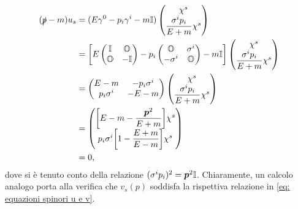 \begin{equation}
    \begin{split}
        (\slashed{p} - m)u_s &= (E\gamma^0 - p_i\gamma^i - m\mathbb{I})
        \begin{pmatrix}
            \chi^s \\
            \dfrac{\sigma^ip_i}{E + m}\chi^s
        \end{pmatrix} \\
        &=\bigg[E
        \begin{pmatrix}
            \mathbb{I} & \mathbb{O} \\
            \mathbb{O} & -\mathbb{I}
        \end{pmatrix}
        - p_i
        \begin{pmatrix}
            \mathbb{O} & \sigma^i \\
            -\sigma^i & \mathbb{O}
        \end{pmatrix}
        -m\mathbb{I}\bigg]
        \begin{pmatrix}
            \chi^s \\
            \dfrac{\sigma^ip_i}{E + m}\chi^s
        \end{pmatrix} \\
        &= 
        \begin{pmatrix}
            E - m & -p_i\sigma^i \\
            p_i\sigma^i & - E - m
        \end{pmatrix}
        \begin{pmatrix}
            \chi^s \\
            \dfrac{\sigma^ip_i}{E + m}\chi^s
        \end{pmatrix} \\
        &= 
        \begin{pmatrix}
            \bigg[E - m - \dfrac{\bm{p}^2}{E + m}\bigg]\chi^s \\
            p_i\sigma^i\bigg[1 - \dfrac{E + m}{E - m}\bigg]\chi^s
        \end{pmatrix} \\
        &= 0,
    \end{split}
\end{equation}
dove si è tenuto conto della relazione $(\sigma^ip_i)^2 = \bm{p}^2\mathbb{I}$. Chiaramente, un calcolo analogo porta alla verifica che $v_s(p)$ soddisfa la rispettiva relazione in \eqref{eq: equazioni spinori u e v}.

